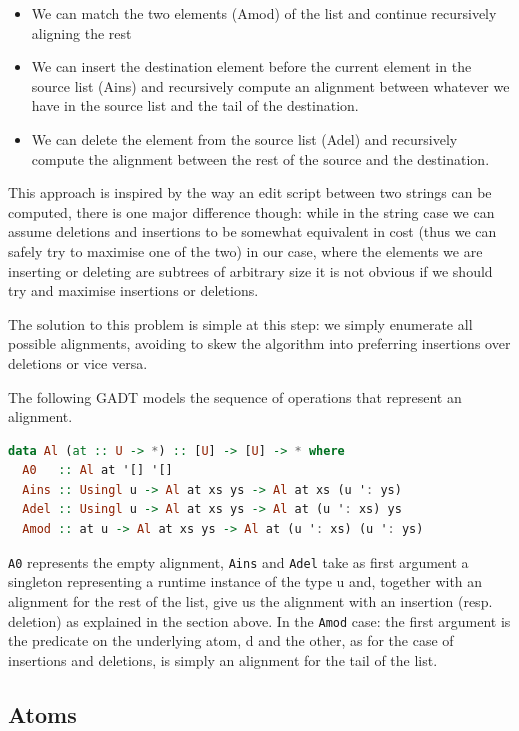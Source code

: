 \documentclass[11pt]{article}
\begin{document}
\begin{itemize}
\item
  We can match the two elements (Amod) of the list and continue
  recursively aligning the rest
\item
  We can insert the destination element before the current element in
  the source list (Ains) and recursively compute an alignment between
  whatever we have in the source list and the tail of the destination.
\item
  We can delete the element from the source list (Adel) and recursively
  compute the alignment between the rest of the source and the
  destination.
\end{itemize}

This approach is inspired by the way an edit script between two strings
can be computed, there is one major difference though: while in the
string case we can assume deletions and insertions to be somewhat
equivalent in cost (thus we can safely try to maximise one of the two)
in our case, where the elements we are inserting or deleting are
subtrees of arbitrary size it is not obvious if we should try and maximise
insertions or deletions.

The solution to this problem is simple at this step: we simply enumerate
all possible alignments, avoiding to skew the algorithm into preferring
insertions over deletions or vice versa.

The following GADT models the sequence of operations that represent an 
alignment.

\begin{lstlisting}[language=haskell]
data Al (at :: U -> *) :: [U] -> [U] -> * where
  A0   :: Al at '[] '[]
  Ains :: Usingl u -> Al at xs ys -> Al at xs (u ': ys)
  Adel :: Usingl u -> Al at xs ys -> Al at (u ': xs) ys
  Amod :: at u -> Al at xs ys -> Al at (u ': xs) (u ': ys)
\end{lstlisting}

\texttt{A0} represents the empty alignment, \texttt{Ains} and \texttt{Adel} take as first argument
a singleton representing a runtime instance of the type u and, together
with an alignment for the rest of the list, give us the alignment with
an insertion (resp. deletion) as explained in the section above. In the
\texttt{Amod} case: the first argument is the predicate on the underlying atom, d
and the other, as for the case of insertions and deletions, is simply an alignment for the tail of the 
list.

\subsection{Atoms}\label{atoms}
\end{document}
